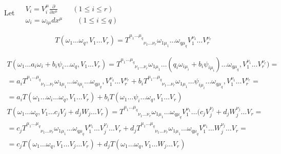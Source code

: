 \documentclass{book}
\begin{document}
Let $\begin{aligned} & \quad \\ 
  & V_i = V_i^{\mu} \frac{ \partial }{ \partial x^{\mu }} \quad \quad ( 1 \leq i \leq r) \\ 
  & \omega_i = \omega_{i \mu} dx^{\mu} \quad \quad ( 1 \leq i \leq q ) \end{aligned}$

\[
T(\omega_1 \dots \omega_q, V_1 \dots V_r) = T^{\mu_1 \dots \mu_q }_{\phantom{\mu_1 \dots \mu_q} \nu_1 \dots \nu_r } \omega_{1 \mu_1} \dots \omega_{q \mu_q} V_1^{\nu_1} \dots V_r^{\nu_r}
\]


\[
\begin{gathered}
  T(\omega_1 \dots a_i \omega_i + b_i \psi_i \dots \omega_q, V_1 \dots V_r) = T^{\mu_1 \dots \mu_q}_{\phantom{\mu_1 \dots \mu_q} \nu_1 \dots \nu_r } \omega_{1 \mu_1} \dots (q_i \omega_{i \mu_i} + b_i \psi_{i \mu_i} ) \dots \omega_{q \mu_q} , V_1^{\nu_1} \dots V_r^{\nu_r} ) =  \\
  = a_i T^{\mu_1 \dots \mu_q}_{\phantom{\mu_1 \dots \mu_q} \nu_1 \dots \nu_r } \omega_{1 \mu_1} \dots \omega_{i \mu_i} \dots \omega_{q \mu_q} , V_1^{\nu_1} \dots V_r^{\nu_r} + b_i T^{\mu_1 \dots \mu_q}_{\phantom{\mu_1 \dots \mu_q} \nu_1 \dots \nu_r } \omega_{1 \mu_1} \dots \psi_{i \mu_i} \dots \omega_{q \mu_q} , V_1^{\nu_1} \dots V_r^{\nu_r} = \\
  = a_i T(\omega_1 \dots \omega_i \dots \omega_q, V_1 \dots V_r) + b_i T(\omega_1 \dots \psi_i \dots \omega_q, V_1 \dots V_r)
\end{gathered}
\]
\[
\begin{gathered}
  T(\omega_1 \dots \omega_q, V_1 \dots c_j V_j + d_j W_j \dots V_r) = T^{ \mu_1 \dots \mu_q}_{\phantom{\mu_1 \dots \mu_q} \nu_1 \dots \nu_r} \omega_{1\mu_1} \dots \omega_{q \mu_q} V_1^{\nu_1} \dots (c_j V_j^{\nu_j} + d_j W_j^{\nu_j} \dots V_r = \\
  = c_j T^{\mu_1 \dots \mu_q}_{\phantom{\mu_1 \dots \mu_q} \nu_1 \dots \nu_r } \omega_{1 \mu_1} \dots \omega_{q \mu_q}  V_1^{\nu_1} \dots V_j^{\nu_j} \dots V_r + d_j T^{\mu_1 \dots \mu_q}_{\phantom{\mu_1 \dots \mu_q} \nu_1 \dots \nu_r } \omega_{1 \mu_1} \dots \omega_{q \mu_q}  V_1^{\nu_1} \dots W_j^{\nu_j} \dots V_r = \\
      = c_j T(\omega_1 \dots \omega_q, V_1 \dots V_j \dots V_r) + d_j T(\omega_1 \dots \omega_q, V_1 \dots W_j \dots V_r)
\end{gathered}
\]
\end{document}
